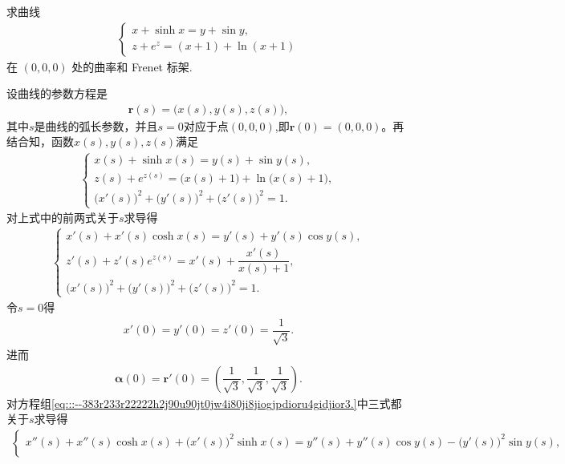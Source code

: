 \documentclass[../../main.tex]{subfiles}%
\begin{document}
\begin{example}
求曲线
\begin{align*}
\begin{cases}
x + \sinh x = y + \sin y, \\
z + e^z = (x + 1) + \ln(x + 1)
\end{cases}
\end{align*}
在 $(0,0,0)$ 处的曲率和 Frenet 标架.
\end{example}
\begin{solution}
设曲线的参数方程是
\begin{align*}
\bm{r}(s) = \big(x(s), y(s), z(s)\big),
\end{align*}
其中$s$是曲线的弧长参数，并且$s=0$对应于点$(0,0,0)$,即$\bm{r}(0)=(0,0,0)$。再结合知，函数$x(s), y(s), z(s)$满足
\begin{align*}
\begin{cases}
x(s) + \sinh x(s) = y(s) + \sin y(s), \\
z(s) + e^{z(s)} = \big(x(s) + 1\big) + \ln\big(x(s) + 1\big), \\
\big(x'(s)\big)^2 + \big(y'(s)\big)^2 + \big(z'(s)\big)^2 = 1.
\end{cases}
\end{align*}
对上式中的前两式关于$s$求导得
\begin{align}
\begin{cases}
x'(s) + x'(s)\cosh x(s) = y'(s) + y'(s)\cos y(s), \\
z'(s) + z'(s)e^{z(s)} = x'(s) + \dfrac{x'(s)}{x(s) + 1}, \\
\big(x'(s)\big)^2 + \big(y'(s)\big)^2 + \big(z'(s)\big)^2 = 1.
\end{cases}
\label{eq:::--383r233r22222h2j90u90jt0jw4i80ji8jiogjpdioru4gidjior3.}
\end{align}
令$s=0$得
\begin{align*}
x'(0) = y'(0) = z'(0) = \dfrac{1}{\sqrt{3}}.
\end{align*}
进而
\begin{align*}
\bm{\alpha}(0) = \bm{r}'(0) = \left( \dfrac{1}{\sqrt{3}}, \dfrac{1}{\sqrt{3}}, \dfrac{1}{\sqrt{3}} \right).
\end{align*}
对方程组\eqref{eq:::--383r233r22222h2j90u90jt0jw4i80ji8jiogjpdioru4gidjior3.}中三式都关于$s$求导得
\begin{align*}
\begin{cases}
x''(s) + x''(s)\cosh x(s) + \big(x'(s)\big)^2\sinh x(s) = y''(s) + y''(s)\cos y(s) - \big(y'(s)\big)^2\sin y(s), \\

\end{cases}
\end{align*}
\end{solution}
\end{document}
